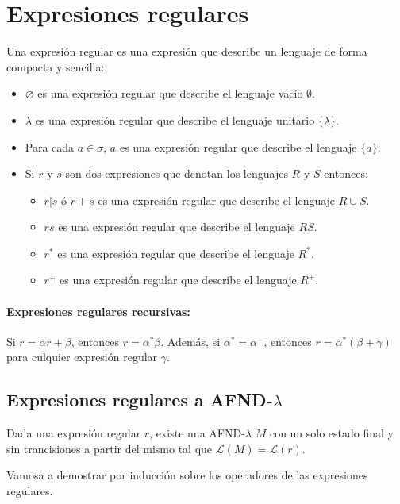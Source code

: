 
\section{Expresiones regulares}
Una expresión regular es una expresión que describe un lenguaje de forma compacta y sencilla:

\begin{itemize}
  \item \(\varnothing\) es una expresión regular que describe el lenguaje vacío \(\emptyset\).
  \item \(\lambda\) es una expresión regular que describe el lenguaje unitario \(\{\lambda\}\).
  \item Para cada \(a\in\sigma\), \(a\) es una expresión regular que describe el lenguaje \(\{a\}\).
  \item Si \(r\) y \(s\) son dos expresiones que denotan los lenguajes \(R\) y \(S\) entonces:
        \begin{itemize}
          \item \(r|s\) ó \(r+s\) es una expresión regular que describe el lenguaje \(R\cup S\).
          \item \(rs\) es una expresión regular que describe el lenguaje \(RS\).
          \item \(r^*\) es una expresión regular que describe el lenguaje \(R^*\).
          \item \(r^+\) es una expresión regular que describe el lenguaje \(R^+\).
        \end{itemize}
\end{itemize}

\paragraph{Expresiones regulares recursivas:} Si \(r=\alpha r + \beta\), entonces \(r = \alpha^* \beta\). Además, si \(\alpha^* = \alpha^+\), entonces \(r = \alpha^*(\beta + \gamma)\) para culquier expresión regular \(\gamma\).

\subsection{Expresiones regulares a AFND-\texorpdfstring{\(\lambda\)}{Lambda}}
Dada una expresión regular \(r\), existe una AFND-\(\lambda\) \(M\) con un solo estado final y sin trancisiones a partir del mismo tal que \(\mathcal{L}(M) = \mathcal{L}(r)\).

Vamosa a demostrar por inducción sobre los operadores de las expresiones regulares.

